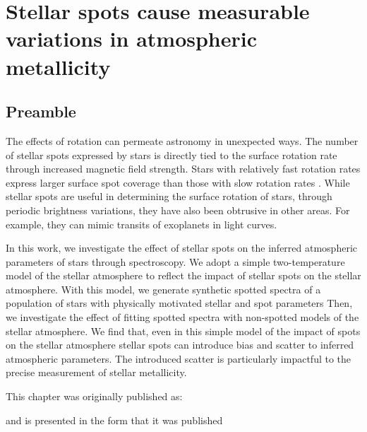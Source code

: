 
\chapter{Stellar spots cause measurable variations in atmospheric metallicity}
\label{chap:stellar_spots}

\section*{Preamble}

The effects of rotation can permeate astronomy in unexpected ways.
The number of stellar spots expressed by stars is directly tied to the surface rotation rate through increased magnetic field strength.
Stars with relatively fast rotation rates express larger surface spot coverage than those with slow rotation rates \citep{cao_starspots_2022}.
While stellar spots are useful in determining the surface rotation of stars, through periodic brightness variations, they have also been obtrusive in other areas.
For example, they can mimic transits of exoplanets in light curves.

In this work, we investigate the effect of stellar spots on the inferred atmospheric parameters of stars through spectroscopy.
We adopt a simple two-temperature model of the stellar atmosphere to reflect the impact of stellar spots on the stellar atmosphere.
With this model, we generate synthetic spotted spectra of a population of stars with physically motivated stellar and spot parameters
Then, we investigate the effect of fitting spotted spectra with non-spotted models of the stellar atmosphere.
We find that, even in this simple model of the impact of spots on the stellar atmosphere stellar spots can introduce bias and scatter to inferred atmospheric parameters.
The introduced scatter is particularly impactful to the precise measurement of stellar metallicity.


This chapter was originally published as:
\begin{quote}
	\citet{tanner_ss}
\end{quote}
and is presented in the form that it was published 



\newpage







